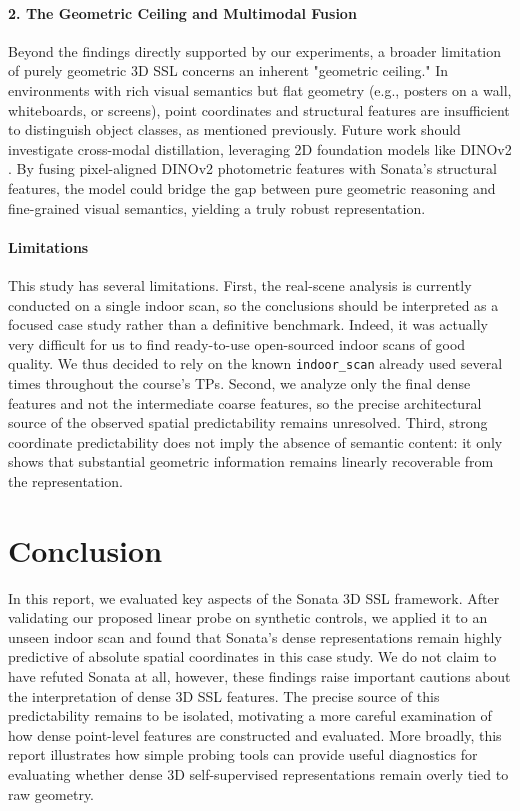 \documentclass[11pt, a4paper]{article}
\begin{document}
\paragraph{2. The Geometric Ceiling and Multimodal Fusion}
Beyond the findings directly supported by our experiments, a broader limitation of purely geometric 3D SSL concerns an inherent "geometric ceiling." In environments with rich visual semantics but flat geometry (e.g., posters on a wall, whiteboards, or screens), point coordinates and structural features are insufficient to distinguish object classes, as mentioned previously. Future work should investigate cross-modal distillation, leveraging 2D foundation models like DINOv2 \cite{dinov2}. By fusing pixel-aligned DINOv2 photometric features with Sonata's structural features, the model could bridge the gap between pure geometric reasoning and fine-grained visual semantics, yielding a truly robust representation.

\paragraph{Limitations}
This study has several limitations. First, the real-scene analysis is currently conducted on a single indoor scan, so the conclusions should be interpreted as a focused case study rather than a definitive benchmark. Indeed, it was actually very difficult for us to find ready-to-use open-sourced indoor scans of good quality. We thus decided to rely on the known \texttt{indoor\_scan} already used several times throughout the course's TPs. Second, we analyze only the final dense features and not the intermediate coarse features, so the precise architectural source of the observed spatial predictability remains unresolved. Third, strong coordinate predictability does not imply the absence of semantic content: it only shows that substantial geometric information remains linearly recoverable from the representation.

\section{Conclusion}
In this report, we evaluated key aspects of the Sonata 3D SSL framework. After validating our proposed linear probe on synthetic controls, we applied it to an unseen indoor scan and found that Sonata's dense representations remain highly predictive of absolute spatial coordinates in this case study. We do not claim to have refuted Sonata at all, however, these findings raise important cautions about the interpretation of dense 3D SSL features. The precise source of this predictability remains to be isolated, motivating a more careful examination of how dense point-level features are constructed and evaluated. More broadly, this report illustrates how simple probing tools can provide useful diagnostics for evaluating whether dense 3D self-supervised representations remain overly tied to raw geometry.
\end{document}
